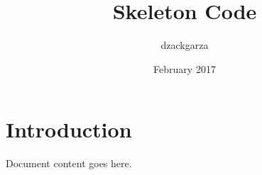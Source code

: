 \documentclass{article}
\title{Skeleton Code}
\author{dzackgarza }
\date{February 2017}
\begin{document}
\maketitle

\section{Introduction}

Document content goes here.
\end{document}
